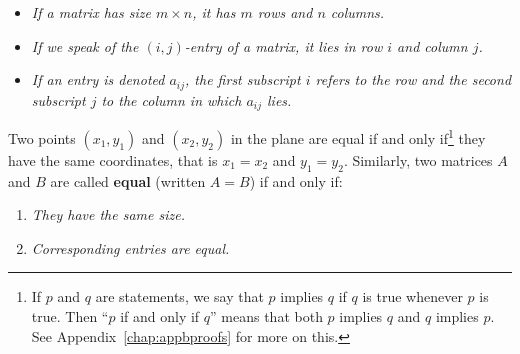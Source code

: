 \begin{itemize}
\item \textit{If a matrix has size $m \times n$, it has $m$ rows and $n$ columns.}

\item \textit{If we speak of the $(i, j)$-entry of a matrix, it lies in row $i$ and column $j$.}

\item \textit{If an entry is denoted $a_{ij}$, the first subscript $i$ refers to the row and the second subscript $j$ to the column in which $a_{ij}$ lies.}

\end{itemize}

Two points $(x_{1}, y_{1})$ and $(x_{2}, y_{2})$ in the plane are equal if and only if\footnote{If $p$ and $q$ are statements, we say that $p$ implies $q$ if $q$ is true whenever $p$ is true. Then ``$p$ if and only if $q$'' means that both $p$ implies $q$ and $q$ implies $p$. See Appendix~\ref{chap:appbproofs} for more on this.} they have the same coordinates, that is $x_{1} = x_{2}$ and $y_{1} = y_{2}$. Similarly, two matrices $A$ and $B$ are called \textbf{equal} (written $A = B$) if and only if:

\begin{enumerate}
\item \textit{They have the same size.}

\item \textit{Corresponding entries are equal.}

\end{enumerate}

